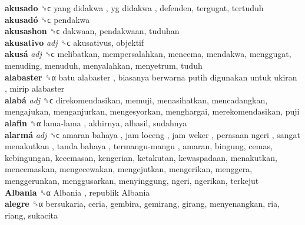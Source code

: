 \textbf{akusado} ␝ϲ   yang didakwa ,  yg didakwa , defenden, tergugat, tertuduh  \\
\textbf{akusadó} ␝ϲ  pendakwa  \\
\textbf{akusashon} ␝ϲ  dakwaan, pendakwaan, tuduhan  \\
\textbf{akusativo} \emph{adj}  ␝ϲ  akusativus, objektif  \\
\textbf{akusá} \emph{adj}  ␝ϲ  melibatkan, mempersalahkan, mencema, mendakwa, menggugat, menuding, menuduh, menyalahkan, menyetrum, tuduh  \\
\textbf{alabaster} ␝α   batu alabaster ,  biasanya berwarna putih digunakan untuk ukiran ,  mirip alabaster   \\
\textbf{alabá} \emph{adj}  ␝ϲ  direkomendasikan, memuji, menasihatkan, mencadangkan, mengajukan, menganjurkan, mengesyorkan, menghargai, merekomendasikan, puji  \\
\textbf{alafin} ␝α   lama-lama , akhirnya, alhasil, sudahnya  \\
\textbf{alarmá} \emph{adj}  ␝ϲ   amaran bahaya ,  jam loceng ,  jam weker ,  perasaan ngeri ,  sangat menakutkan ,  tanda bahaya ,  termangu-mangu , amaran, bingung, cemas, kebingungan, kecemasan, kengerian, ketakutan, kewaspadaan, menakutkan, mencemaskan, mengecewakan, mengejutkan, mengerikan, menggera, menggerunkan, menggusarkan, menyinggung, ngeri, ngerikan, terkejut  \\
\textbf{Albania} ␝α   Albania ,  republik Albania   \\
\textbf{alegre} ␝α  bersukaria, ceria, gembira, gemirang, girang, menyenangkan, ria, riang, sukacita  \\
